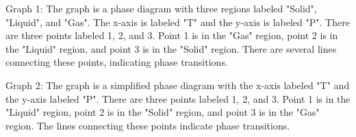 Graph 1: The graph is a phase diagram with three regions labeled "Solid", "Liquid", and "Gas". The x-axis is labeled "T" and the y-axis is labeled "P". There are three points labeled 1, 2, and 3. Point 1 is in the "Gas" region, point 2 is in the "Liquid" region, and point 3 is in the "Solid" region. There are several lines connecting these points, indicating phase transitions.

Graph 2: The graph is a simplified phase diagram with the x-axis labeled "T" and the y-axis labeled "P". There are three points labeled 1, 2, and 3. Point 1 is in the "Liquid" region, point 2 is in the "Solid" region, and point 3 is in the "Gas" region. The lines connecting these points indicate phase transitions.